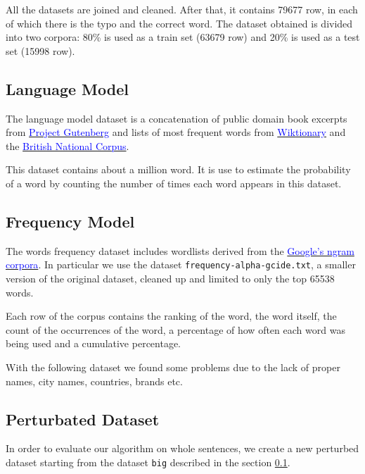All the datasets are joined and cleaned. After that, it contains \num{79677} row, in each of which there 
is the typo and the correct word.
The dataset obtained is divided into two corpora: \num{80}\% is used as a train set (\num{63679} row) and \num{20}\% is 
used as a test set (\num{15998} row).

\subsection{Language Model}
\label{subsection:languagemodel}
The language model dataset is a concatenation of public domain book excerpts from 
\href{http://www.gutenberg.org/wiki/Main_Page}{ \textcolor{blue}{Project Gutenberg}}  and lists of most frequent words 
from \href{https://en.wiktionary.org/wiki/Wiktionary:Frequency_lists}{ \textcolor{blue}{Wiktionary}} and the 
\href{http://www.kilgarriff.co.uk/bnc-readme.html}{\textcolor{blue}{British National Corpus}}. 

This dataset contains about a million word. It is use to estimate the probability of a word by counting the number of times 
each word appears in this dataset. %

\subsection{Frequency Model}
The words frequency dataset includes wordlists derived from the \href{https://books.google.com/ngrams/}{ 
\textcolor{blue}{Google's ngram corpora}}. In particular we use the dataset \texttt{frequency-alpha-gcide.txt}, a smaller 
version of the original dataset, cleaned up and limited to only the top \num{65538} words.

Each row of the corpus contains the ranking of the word, the word itself, the count of the occurrences of the word, a 
percentage of how often each word was being used and a cumulative percentage.

With the following dataset we found some problems due to the lack of proper names, city names, countries, brands etc.

\subsection{Perturbated Dataset}
In order to evaluate our algorithm on whole sentences, we create a new perturbed dataset starting from the dataset 
\texttt{big} described in the section \ref{subsection:languagemodel}.

